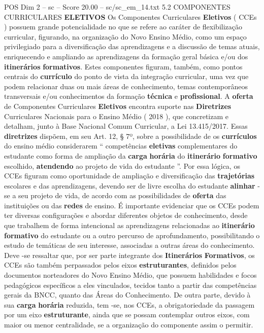 \begin{textsample}{POS Dim 2 – sc – Score 20.00 – sc/sc\_em\_14.txt}  \label{ex:f2_pos_017}
5.2 COMPONENTES CURRICULARES \textbf{ELETIVOS} Os Componentes Curriculares \textbf{Eletivos} ( CCEs ) possuem grande potencialidade no que se refere ao caráter de flexibilização curricular, figurando, na organização do Novo Ensino Médio, como um espaço privilegiado para a diversificação das aprendizagens e a discussão de temas atuais, enriquecendo e ampliando as aprendizagens da formação geral básica e/ou dos \textbf{itinerários} \textbf{formativos}.
Estes componentes figuram, também, como pontos centrais do \textbf{currículo} do ponto de vista da integração curricular, uma vez que podem relacionar duas ou mais áreas de conhecimento, temas contemporâneos transversais e/ou conhecimentos da formação \textbf{técnica} e \textbf{profissional}.
A \textbf{oferta} de Componentes Curriculares \textbf{Eletivos} encontra suporte nas \textbf{Diretrizes} Curriculares Nacionais para o Ensino Médio ( 2018 ), que concretizam e detalham, junto à Base Nacional Comum Curricular, a Lei 13.415/2017.
Essas \textbf{diretrizes} dispõem, em seu Art. 12, § 7º, sobre a possibilidade de os \textbf{currículos} do ensino médio considerarem “ competências \textbf{eletivas} complementares do estudante como forma de ampliação da \textbf{carga} \textbf{horária} do \textbf{itinerário} \textbf{formativo} escolhido, \textbf{atendendo} ao projeto de vida do estudante ”.
Por essa lógica, os CCEs figuram como oportunidade de ampliação e diversificação das \textbf{trajetórias} escolares e das aprendizagens, devendo ser de livre escolha do estudante \textbf{alinhar} -se a seu projeto de vida, de acordo com as possibilidades de \textbf{oferta} das instituições ou das \textbf{redes} de ensino.
É importante evidenciar que os CCEs podem ter diversas configurações e abordar diferentes objetos de conhecimento, desde que trabalhem de forma intencional as aprendizagens relacionadas ao \textbf{itinerário} \textbf{formativo} do estudante ou a outro percurso de aprofundamento, possibilitando o estudo de temáticas de seu interesse, associadas a outras áreas do conhecimento.
Deve -se ressaltar que, por ser parte integrante dos \textbf{Itinerários} \textbf{Formativos}, os CCEs são também perpassados pelos eixos \textbf{estruturantes}, definidos pelos documentos norteadores do Novo Ensino Médio, que possuem habilidades e focos pedagógicos específicos a eles vinculados, tecidos tanto a partir das competências gerais da BNCC, quanto das Áreas do Conhecimento.
De outra parte, devido à sua \textbf{carga} \textbf{horária} reduzida, tem -se, nos CCEs, a obrigatoriedade da passagem por um eixo \textbf{estruturante}, ainda que se possam contemplar outros eixos, com maior ou menor centralidade, se a organização do componente assim o permitir.

\end{textsample}
